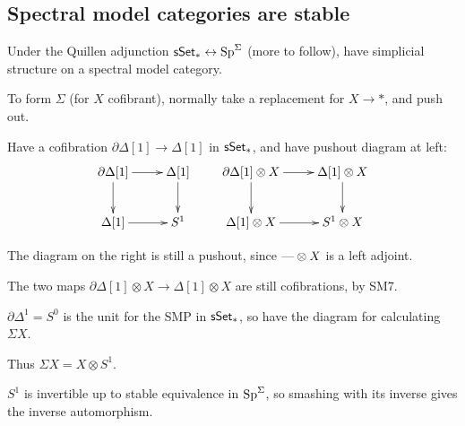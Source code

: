 \documentclass[11pt]{article}
\begin{document}
\begin{MichaelStableModelCats}
\subsection*{Spectral model categories are stable}
\begin{itemise}
\item Under the Quillen adjunction $\operatorname{{\mathsf{sSet}}}_*\leftrightarrow\operatorname{Sp}^\Sigma$ (more to follow), have simplicial structure on a spectral model category.
\item To form $\Sigma$ (for $X$ cofibrant), normally take a replacement for $X\to \ast$, and push out. 
\begin{itemise}
\item Have a cofibration $\partial\Delta[1]\to\Delta[1]$ in $\operatorname{{\mathsf{sSet}}}_*$, and have pushout diagram at left:
\[\xymatrix{
\partial\Delta[1]\ar[r]\ar[d]&\Delta[1]\ar[d]\\
\Delta[1]\ar[r]&S^1
}\qquad\xymatrix{
\partial\Delta[1]\otimes X\ar[r]\ar[d]&\Delta[1]\otimes X\ar[d]\\
\Delta[1]\otimes X\ar[r]&S^1\otimes X
}\]
\item The diagram on the right is still a pushout, since $\textup{---}\otimes X$ is a left adjoint. 
\item The two maps $\partial\Delta[1]\otimes X\to\Delta[1]\otimes X$ are still cofibrations, by SM7. 
\item $\partial\Delta^1=S^0$ is the unit for the SMP in $\operatorname{{\mathsf{sSet}}}_*$, so have the diagram for calculating $\Sigma X$.
\item Thus $\Sigma X=X\otimes S^1$.
\end{itemise}
\item $S^1$ is invertible up to stable equivalence in $\operatorname{Sp}^\Sigma$, so smashing with its inverse gives the inverse automorphism.
\end{itemise}

\end{MichaelStableModelCats}
\end{document}
